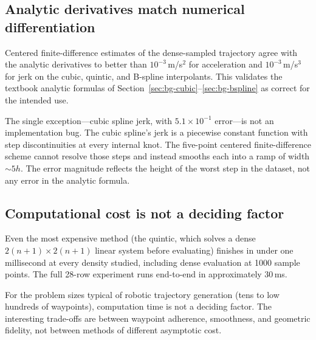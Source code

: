 \subsection{Analytic derivatives match numerical differentiation}
\label{sec:disc-validation}

Centered finite-difference estimates of the dense-sampled trajectory
agree with the analytic derivatives to better than $10^{-3}$\,m/s$^2$
for acceleration and $10^{-3}$\,m/s$^3$ for jerk on the cubic,
quintic, and B-spline interpolants. This validates the textbook
analytic formulas of Section~\ref{sec:bg-cubic}--\ref{sec:bg-bspline}
as correct for the intended use.

The single exception---cubic spline jerk, with $5.1 \times 10^{-1}$
error---is not an implementation bug. The cubic spline's jerk is a
piecewise constant function with step discontinuities at every
internal knot. The five-point centered finite-difference scheme
cannot resolve those steps and instead smooths each into a ramp of
width $\sim 5h$. The error magnitude reflects the height of the
worst step in the dataset, not any error in the analytic formula.

\subsection{Computational cost is not a deciding factor}
\label{sec:disc-compute}

Even the most expensive method (the quintic, which solves a dense
$2(n+1) \times 2(n+1)$ linear system before evaluating) finishes in
under one millisecond at every density studied, including dense
evaluation at 1000 sample points. The full 28-row experiment runs
end-to-end in approximately 30\,ms.

For the problem sizes typical of robotic trajectory generation
(tens to low hundreds of waypoints), computation time is not a
deciding factor. The interesting trade-offs are between waypoint
adherence, smoothness, and geometric fidelity, not between methods
of different asymptotic cost.
